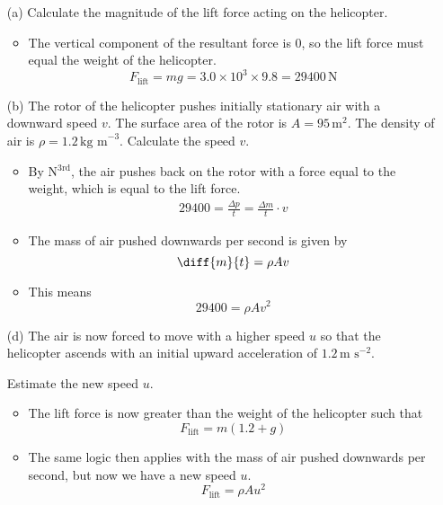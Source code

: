 \documentclass[a4paper,12pt]{article}
\begin{document}
\begin{enumerate}
  \item[(a)] Calculate the magnitude of the lift force acting on the helicopter.
        \begin{itemize}
          \item The vertical component of the resultant force is 0, so the lift force must equal the weight of the helicopter.
                $$F_\text{lift} = mg = 3.0 \times 10^3 \times 9.8 = 29400 \, \text{N}$$
        \end{itemize}

  \item[(b)] The rotor of the helicopter pushes initially stationary air with a downward speed \( v \). The surface area of the rotor is \( A = 95 \, \text{m}^2 \). The density of air is \( \rho = 1.2 \, \text{kg m}^{-3} \). Calculate the speed \( v \).
        \begin{itemize}
          \item By N$^\text{3rd}$, the air pushes back on the rotor with a force equal to the weight, which is equal to the lift force.
                \begin{align*}
                  29400 = \frac{\Delta p}{t} = \frac{\Delta m}{t} \cdot v
                \end{align*}
          \item The mass of air pushed downwards per second is given by
                $$\diff{m}{t} = \rho A v$$
          \item This means $$29400 = \rho A v^2$$
        \end{itemize}

  \item[(d)] The air is now forced to move with a higher speed \( u \) so that the helicopter ascends with an initial upward acceleration of \( 1.2 \, \text{m s}^{-2} \).

        Estimate the new speed \( u \).
        \begin{itemize}
          \item The lift force is now greater than the weight of the helicopter such that
                $$F_\text{lift} = m(1.2 + g)$$
          \item The same logic then applies with the mass of air pushed downwards per second, but now we have a new speed $u$.
                $$F_\text{lift} = \rho A u^2$$
        \end{itemize}
\end{enumerate}
\end{document}
